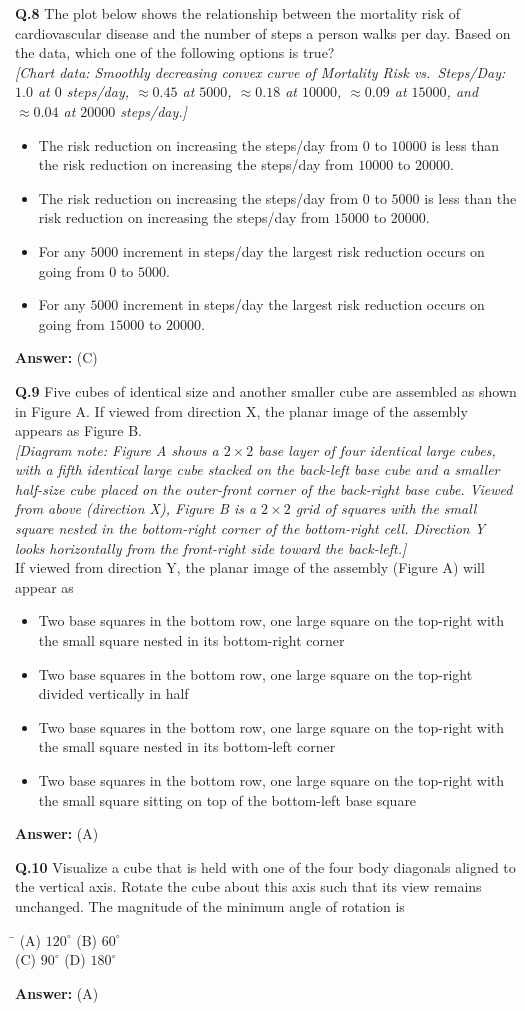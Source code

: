 \documentclass[11pt,a4paper]{article}
\newcommand{\optsfourA}[4]{%
  \begin{tabbing}
    \hspace{0.48\linewidth}\=\kill
    (A) #1 \> (B) #2 \\[2pt]
    (C) #3 \> (D) #4
  \end{tabbing}%
}
\newcommand{\optslistA}[4]{%
  \begin{itemize}
    \setlength{\itemsep}{2pt}\setlength{\parskip}{0pt}
    \item[(A)] #1
    \item[(B)] #2
    \item[(C)] #3
    \item[(D)] #4
  \end{itemize}%
}
\newcommand{\ans}[1]{\textbf{Answer:} #1\par\medskip}
\begin{document}
\textbf{Q.8} The plot below shows the relationship between the mortality risk of cardiovascular disease and the number of steps a person walks per day. Based on the data, which one of the following options is true?\\[4pt]
\emph{[Chart data: Smoothly decreasing convex curve of Mortality Risk vs.\ Steps/Day: $1.0$ at $0$ steps/day, $\approx 0.45$ at $5000$, $\approx 0.18$ at $10000$, $\approx 0.09$ at $15000$, and $\approx 0.04$ at $20000$ steps/day.]}
\optslistA{The risk reduction on increasing the steps/day from $0$ to $10000$ is less than the risk reduction on increasing the steps/day from $10000$ to $20000$.}{The risk reduction on increasing the steps/day from $0$ to $5000$ is less than the risk reduction on increasing the steps/day from $15000$ to $20000$.}{For any $5000$ increment in steps/day the largest risk reduction occurs on going from $0$ to $5000$.}{For any $5000$ increment in steps/day the largest risk reduction occurs on going from $15000$ to $20000$.}
\ans{(C)}

\textbf{Q.9} Five cubes of identical size and another smaller cube are assembled as shown in Figure A. If viewed from direction X, the planar image of the assembly appears as Figure B.\\
\emph{[Diagram note: Figure A shows a $2 \times 2$ base layer of four identical large cubes, with a fifth identical large cube stacked on the back-left base cube and a smaller half-size cube placed on the outer-front corner of the back-right base cube. Viewed from above (direction X), Figure B is a $2 \times 2$ grid of squares with the small square nested in the bottom-right corner of the bottom-right cell. Direction Y looks horizontally from the front-right side toward the back-left.]}\\
If viewed from direction Y, the planar image of the assembly (Figure A) will appear as
\optslistA{Two base squares in the bottom row, one large square on the top-right with the small square nested in its bottom-right corner}{Two base squares in the bottom row, one large square on the top-right divided vertically in half}{Two base squares in the bottom row, one large square on the top-right with the small square nested in its bottom-left corner}{Two base squares in the bottom row, one large square on the top-right with the small square sitting on top of the bottom-left base square}
\ans{(A)}

\textbf{Q.10} Visualize a cube that is held with one of the four body diagonals aligned to the vertical axis. Rotate the cube about this axis such that its view remains unchanged. The magnitude of the minimum angle of rotation is
\optsfourA{$120^\circ$}{$60^\circ$}{$90^\circ$}{$180^\circ$}
\ans{(A)}
\end{document}
